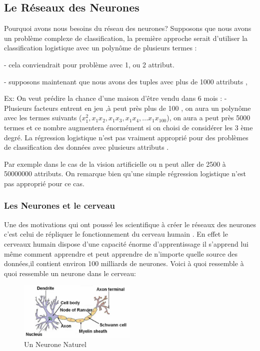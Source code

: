 \subsection{Le Réseaux des Neurones }
Pourquoi avons nous besoins du réseau des neurones? 
Supposons que nous avons un problème complexe de classification, la première approche serait d'utiliser la classification logistique avec un polynôme de plusieurs termes :

- cela conviendrait pour problème avec 1, ou 2 attribut.

- supposons maintenant que nous avons des  tuples avec plus de 1000 attributs ,

Ex: On veut prédire la chance d'une maison d'être vendu dans 6 mois  :
- Plusieurs facteurs entrent en jeu ,à peut près plus de 100 , on aura un polynôme avec les termes suivants (${x}_{1}^{2},{x}_{1}{x}_{2},{x}_{1}{x}_{3},{x}_{1}{x}_{4},...{x}_{1}{x}_{100}$),
on aura a peut près 5000 termes et ce nombre augmentera énormément si on choisi de considérer les 3 ème degré.
La régression logistique n'est pas vraiment approprié pour des problèmes de classification des données avec plusieurs attributs .

Par exemple dans le cas de la vision artificielle ou n peut aller de 2500 à 50000000  attributs.
On remarque bien qu'une simple régression logistique n'est pas approprié pour ce cas.

\subsubsection{Les Neurones et le cerveau\cite{NNBook}}

Une des motivations qui ont poussé les scientifique à créer le réseaux des neurones c'est celui de répliquer le fonctionnement du cerveau humain .
En effet le cerveaux humain dispose d'une capacité énorme d'apprentissage il s'apprend lui même comment apprendre et peut apprendre de n'importe quelle source des données,il  contient environ 100 milliards de neurones.
Voici à quoi ressemble à quoi ressemble un neurone dans le cerveau:
\begin{figure}[ht]
	\centering
	\includegraphics[width=0.5\textwidth]{fig/Neurone.png}
	\caption[Short caption]{Un Neurone Naturel}
	\label{fig:image9}
\end{figure}

